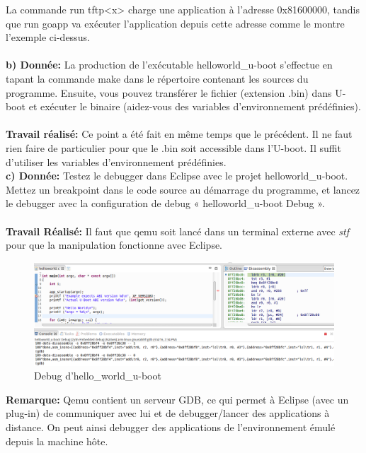 La commande run tftp<x> charge une application à l'adresse 0x81600000, tandis que run goapp va exécuter l'application depuis cette adresse comme le montre l'exemple ci-dessus.\\\\
\textbf{b) Donnée: }La production de l'exécutable helloworld\_u-boot s'effectue en tapant la commande make dans le
répertoire contenant les sources du programme. Ensuite, vous pouvez transférer le fichier (extension
.bin) dans U-boot et exécuter le binaire (aidez-vous des variables d'environnement prédéfinies). \\\\
\textbf{Travail réalisé: } Ce point a été fait en même temps que le précédent. Il ne faut rien faire de particulier pour que le .bin soit accessible dans l'U-boot. Il suffit d'utiliser les variables d'environnement prédéfinies.\\

\textbf{c) Donnée: } Testez le debugger dans Eclipse avec le projet helloworld\_u-boot. Mettez un breakpoint dans le
code source au démarrage du programme, et lancez le debugger avec la configuration de debug
« helloworld\_u-boot Debug ». \\\\
\textbf{Travail Réalisé: } Il faut que qemu soit lancé dans un terminal externe avec \textit{stf} pour que la manipulation fonctionne avec Eclipse.
\begin{figure}[H]
	\begin{center}
		\includegraphics[width=18cm]{img/ubootCommand2.png}
		\caption{Debug d'hello\_world\_u-boot}
		\label{ubootComm2}
	\end{center}
\end{figure}
\textbf{Remarque: }Qemu contient un serveur GDB, ce qui permet à Eclipse (avec un plug-in) de communiquer avec lui et de debugger/lancer des applications à distance. On peut ainsi debugger des applications de l'environnement émulé depuis la machine hôte. 
